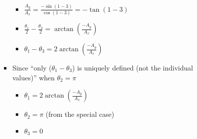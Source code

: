 \documentclass[letterpaper]{article}
\begin{document}
\begin{itemize}
\begin{itemize}
\begin{enumerate}
\begin{itemize}
									\begin{itemize}
										\item $\frac{A_y}{A_x} = \frac{-\sin{\left(1-3\right)}}{\cos{\left(1-3\right)}} = -\tan{\left(1-3\right)}$
										\item $\frac{\theta_1}{2} - \frac{\theta_3}{2} = \arctan{\left(\frac{-A_y}{A_x}\right)}$
										\item $\theta_1 - \theta_3 = 2\arctan{\left(\frac{-A_y}{A_x}\right)}$
									\end{itemize}
								\item Since ``only ($\theta_1 - \theta_3$) is uniquely defined (not the individual values)''\cite{Wikipedia2008e} when $\theta_2 = \pi$
									\begin{itemize}
										\item $\theta_1 = 2\arctan{\left(\frac{-A_y}{A_x}\right)}$
										\item $\theta_2 = \pi$ (from the special case)
										\item $\theta_3 = 0$
									\end{itemize}
							\end{itemize}
					\end{enumerate}
			\end{itemize}
	\end{itemize}
	
	
	
\end{document}
